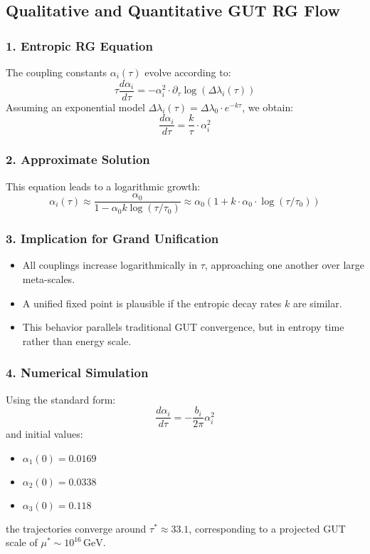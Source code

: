\documentclass[10.5pt,a4paper]{article}
\begin{document}
\subsection{Qualitative and Quantitative GUT RG Flow}

\subsubsection*{1. Entropic RG Equation}
The coupling constants \( \alpha_i(\tau) \) evolve according to:
\[
\tau \frac{d\alpha_i}{d\tau} = -\alpha_i^2 \cdot \partial_\tau \log(\Delta\lambda_i(\tau))
\]
Assuming an exponential model \( \Delta\lambda_i(\tau) = \Delta\lambda_0 \cdot e^{-k\tau} \), we obtain:
\[
\frac{d\alpha_i}{d\tau} = \frac{k}{\tau} \cdot \alpha_i^2
\]

\subsubsection*{2. Approximate Solution}
This equation leads to a logarithmic growth:
\[
\alpha_i(\tau) \approx \frac{\alpha_0}{1 - \alpha_0 k \log(\tau/\tau_0)} \approx \alpha_0 \left(1 + k \cdot \alpha_0 \cdot \log(\tau/\tau_0) \right)
\]

\subsubsection*{3. Implication for Grand Unification}
\begin{itemize}
    \item All couplings increase logarithmically in \( \tau \), approaching one another over large meta-scales.
    \item A unified fixed point is plausible if the entropic decay rates \( k \) are similar.
    \item This behavior parallels traditional GUT convergence, but in entropy time rather than energy scale.
\end{itemize}

\subsubsection*{4. Numerical Simulation}
Using the standard form:
\[
\frac{d\alpha_i}{d\tau} = -\frac{b_i}{2\pi} \alpha_i^2
\]
and initial values:
\begin{itemize}
    \item \( \alpha_1(0) = 0.0169 \)
    \item \( \alpha_2(0) = 0.0338 \)
    \item \( \alpha_3(0) = 0.118 \)
\end{itemize}
the trajectories converge around \( \tau^* \approx 33.1 \), corresponding to a projected GUT scale of \( \mu^* \sim 10^{16}\,\mathrm{GeV} \).
\end{document}
